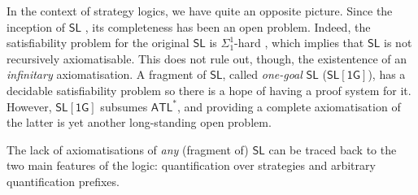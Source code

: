 \documentclass[sigconf,anonymous]{aamas}
\begin{document}
In the context of strategy logics, we have quite an opposite picture. Since the inception of $\mathsf{SL}$ \cite{mogavero10}, its completeness has been an open problem. Indeed, the satisfiability problem for the original $\mathsf{SL}$ is $\Sigma^1_1$-hard \cite{mogavero16}, which implies that $\mathsf{SL}$ is not recursively axiomatisable. This does not rule out, though, the existentence of an \textit{infinitary} axiomatisation.
A fragment of $\mathsf{SL}$, called \textit{one-goal} $\mathsf{SL}$ ($\mathsf{SL[1G]}$), has a decidable satisfiability problem so there is a hope of having a proof system for it. However, $\mathsf{SL[1G]}$ subsumes $\mathsf{ATL}^\ast$, and providing a complete axiomatisation of the latter is yet another long-standing open problem. 

The lack of axiomatisations of \textit{any} (fragment of) $\mathsf{SL}$ can be traced back to the two main features of the logic: quantification over strategies and arbitrary quantification prefixes. %


\end{document}
